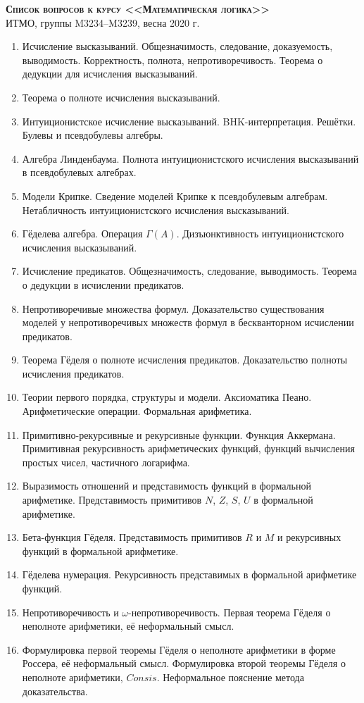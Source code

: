 \documentclass[11pt,a4paper,oneside]{scrartcl}
\begin{document}
\pagestyle{empty}

\begin{center}
{\large\scshape\bfseries Список вопросов к курсу <<Математическая логика>>}\\
ИТМО, группы M3234--M3239, весна 2020 г.
\end{center}


\begin{enumerate}
\item Исчисление высказываний. Общезначимость, следование, доказуемость, выводимость. Корректность, полнота, непротиворечивость.
Теорема о дедукции для исчисления высказываний.
\item Теорема о полноте исчисления высказываний.
\item Интуиционистское исчисление высказываний. BHK-интерпретация. Решётки. Булевы и псевдобулевы алгебры.
\item Алгебра Линденбаума. Полнота интуиционистского исчисления высказываний в псевдобулевых алгебрах.
\item Модели Крипке. Сведение моделей Крипке к псевдобулевым алгебрам. Нетабличность интуиционистского исчисления высказываний.
\item Гёделева алгебра. Операция $\Gamma(A)$. Дизъюнктивность интуиционистского исчисления высказываний.
\item Исчисление предикатов. Общезначимость, следование, выводимость. Теорема о дедукции в исчислении предикатов.
\item Непротиворечивые множества формул. Доказательство существования моделей у непротиворечивых множеств формул 
в бескванторном исчислении предикатов.
\item Теорема Гёделя о полноте исчисления предикатов. Доказательство полноты исчисления предикатов.
\item Теории первого порядка, структуры и модели. Аксиоматика Пеано. Арифметические операции. Формальная арифметика. 
\item Примитивно-рекурсивные и рекурсивные функции. Функция Аккермана. Примитивная рекурсивность 
арифметических функций, функций вычисления простых чисел, частичного логарифма.
\item Выразимость отношений и представимость функций в формальной арифметике. 
Представимость примитивов $N$, $Z$, $S$, $U$ в формальной арифметике.
\item Бета-функция Гёделя. Представимость примитивов $R$ и $M$ и рекурсивных функций в формальной арифметике.
\item Гёделева нумерация. Рекурсивность представимых в формальной арифметике функций.
\item Непротиворечивость и $\omega$-непротиворечивость. Первая теорема Гёделя о неполноте арифметики, её неформальный смысл.
\item Формулировка первой теоремы Гёделя о неполноте арифметики в форме Россера, её неформальный смысл. 
Формулировка второй теоремы Гёделя о неполноте арифметики, $Consis$. 
Неформальное пояснение метода доказательства.
\end{enumerate}
\end{document}
